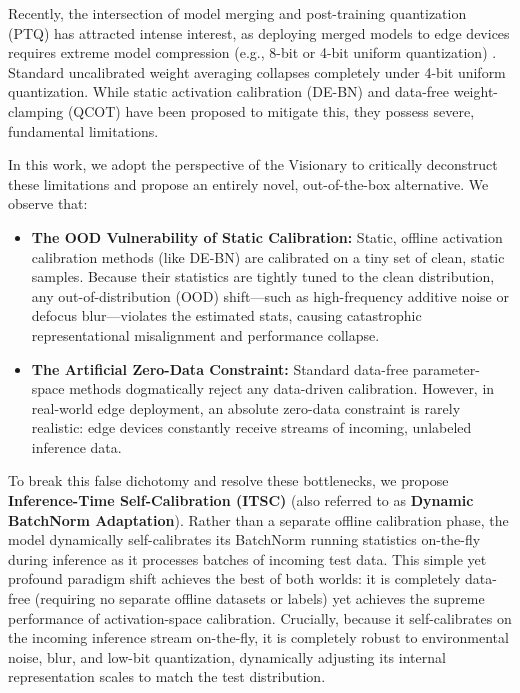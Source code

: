 \documentclass{article}
\theoremstyle{plain}
\theoremstyle{definition}
\theoremstyle{remark}
\begin{document}
Recently, the intersection of model merging and post-training quantization (PTQ) has attracted intense interest, as deploying merged models to edge devices requires extreme model compression (e.g., 8-bit or 4-bit uniform quantization) \cite{gholami21}. Standard uncalibrated weight averaging collapses completely under 4-bit uniform quantization. While static activation calibration (DE-BN) and data-free weight-clamping (QCOT) \cite{anonymous26c} have been proposed to mitigate this, they possess severe, fundamental limitations. 

In this work, we adopt the perspective of the Visionary to critically deconstruct these limitations and propose an entirely novel, out-of-the-box alternative. We observe that:
\begin{itemize}
    \item \textbf{The OOD Vulnerability of Static Calibration:} Static, offline activation calibration methods (like DE-BN) are calibrated on a tiny set of clean, static samples. Because their statistics are tightly tuned to the clean distribution, any out-of-distribution (OOD) shift—such as high-frequency additive noise or defocus blur—violates the estimated stats, causing catastrophic representational misalignment and performance collapse.
    \item \textbf{The Artificial Zero-Data Constraint:} Standard data-free parameter-space methods dogmatically reject any data-driven calibration. However, in real-world edge deployment, an absolute zero-data constraint is rarely realistic: edge devices constantly receive streams of incoming, unlabeled inference data.
\end{itemize}

To break this false dichotomy and resolve these bottlenecks, we propose \textbf{Inference-Time Self-Calibration (ITSC)} (also referred to as \textbf{Dynamic BatchNorm Adaptation}). Rather than a separate offline calibration phase, the model dynamically self-calibrates its BatchNorm running statistics on-the-fly during inference as it processes batches of incoming test data. This simple yet profound paradigm shift achieves the best of both worlds: it is completely data-free (requiring no separate offline datasets or labels) yet achieves the supreme performance of activation-space calibration. Crucially, because it self-calibrates on the incoming inference stream on-the-fly, it is completely robust to environmental noise, blur, and low-bit quantization, dynamically adjusting its internal representation scales to match the test distribution.
\end{document}
